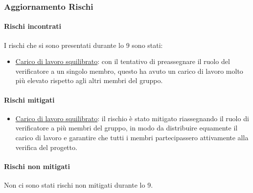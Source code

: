 \subsubsection{Aggiornamento Rischi}
\label{sec:aggiornamento_rischi_sprint9}

\paragraph{Rischi incontrati}
\label{par:rischi_incontrati_sprint9}
I rischi che si sono presentati durante lo  9 sono stati:
\begin{itemize}
    \item \hyperref[rischio:RO7]{Carico di lavoro squilibrato}: con il tentativo di preassegnare il ruolo del verificatore a un singolo membro, questo ha avuto un carico di lavoro molto più elevato rispetto agli altri membri del gruppo.
\end{itemize}

\paragraph{Rischi mitigati}
\label{par:rischi_mitigati_sprint9}
\begin{itemize}
    \item \hyperref[rischio:RO7]{Carico di lavoro squilibrato}: il rischio è stato mitigato riassegnando il ruolo di verificatore a più membri del gruppo, in modo da distribuire equamente il carico di lavoro e garantire che tutti i membri partecipassero attivamente alla verifica del progetto.
\end{itemize}

\paragraph{Rischi non mitigati}
\label{par:rischi_non_mitigati_sprint9}
Non ci sono stati rischi non mitigati durante lo  9.
